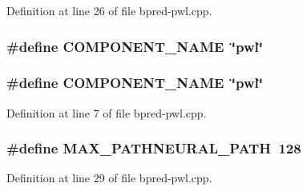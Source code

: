 Definition at line 26 of file bpred-pwl.cpp.
\subsubsection[{COMPONENT\_\-NAME}]{\setlength{\rightskip}{0pt plus 5cm}\#define COMPONENT\_\-NAME~\char`\"{}pwl\char`\"{}}\label{zesto-bpred_8cpp_9146ade7ce24e3db226a973a59063892}


\subsubsection[{COMPONENT\_\-NAME}]{\setlength{\rightskip}{0pt plus 5cm}\#define COMPONENT\_\-NAME~\char`\"{}pwl\char`\"{}}\label{bpred-pwl_8cpp_9146ade7ce24e3db226a973a59063892}




Definition at line 7 of file bpred-pwl.cpp.
\subsubsection[{MAX\_\-PATHNEURAL\_\-PATH}]{\setlength{\rightskip}{0pt plus 5cm}\#define MAX\_\-PATHNEURAL\_\-PATH~128}\label{bpred-pwl_8cpp_4f7d20fcbe299b54b9716780a4866250}




Definition at line 29 of file bpred-pwl.cpp.